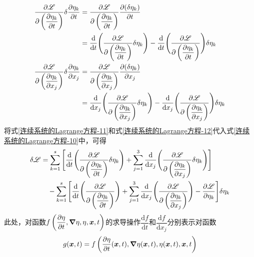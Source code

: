 \begin{align}
	\frac{\partial \mathscr{L}}{\partial \left(\dfrac{\partial \eta_k}{\partial t}\right)} \delta \dfrac{\partial \eta_k}{\partial t} & = \frac{\partial \mathscr{L}}{\partial \left(\dfrac{\partial \eta_k}{\partial t}\right)} \dfrac{\partial (\delta \eta_k)}{\partial t} \nonumber \\
	& = \frac{\mathrm{d}}{\mathrm{d}t} \Bigg(\frac{\partial \mathscr{L}}{\partial \left(\dfrac{\partial \eta_k}{\partial t}\right)} \delta \eta_k\Bigg) - \frac{\mathrm{d}}{\mathrm{d}t} \Bigg(\frac{\partial \mathscr{L}}{\partial \left(\dfrac{\partial \eta_k}{\partial t}\right)}\Bigg) \delta \eta_k \label{连续系统的Lagrange方程-11} \\
	\frac{\partial \mathscr{L}}{\partial \left(\dfrac{\partial \eta_k}{\partial x_j}\right)} \delta \dfrac{\partial \eta_k}{\partial x_j} & = \frac{\partial \mathscr{L}}{\partial \left(\dfrac{\partial \eta_k}{\partial x_j}\right)} \dfrac{\partial (\delta \eta_k)}{\partial x_j} \nonumber \\
	& = \frac{\mathrm{d}}{\mathrm{d}x_j} \Bigg(\frac{\partial \mathscr{L}}{\partial \left(\dfrac{\partial \eta_k}{\partial x_j}\right)} \delta \eta_k\Bigg) - \frac{\mathrm{d}}{\mathrm{d}x_j} \Bigg(\frac{\partial \mathscr{L}}{\partial \left(\dfrac{\partial \eta_k}{\partial x_j}\right)}\Bigg) \delta \eta_k \label{连续系统的Lagrange方程-12}
\end{align}
将式\eqref{连续系统的Lagrange方程-11}和式\eqref{连续系统的Lagrange方程-12}代入式\eqref{连续系统的Lagrange方程-10}中，可得
\begin{align}
	\delta \mathscr{L} & = \sum_{k=1}^s \Bigg[\frac{\mathrm{d}}{\mathrm{d}t} \Bigg(\frac{\partial \mathscr{L}}{\partial \left(\dfrac{\partial \eta_k}{\partial t}\right)} \delta \eta_k\Bigg) + \sum_{j=1}^3 \frac{\mathrm{d}}{\mathrm{d}x_j} \Bigg(\frac{\partial \mathscr{L}}{\partial \left(\dfrac{\partial \eta_k}{\partial x_j}\right)} \delta \eta_k\Bigg)\Bigg] \nonumber \\
	& \quad {}- \sum_{k=1}^s \Bigg[\frac{\mathrm{d}}{\mathrm{d}t} \Bigg(\frac{\partial \mathscr{L}}{\partial \left(\dfrac{\partial \eta_k}{\partial t}\right)}\Bigg) + \sum_{j=1}^3 \frac{\mathrm{d}}{\mathrm{d}x_j} \Bigg(\frac{\partial \mathscr{L}}{\partial \left(\dfrac{\partial \eta_k}{\partial x_j}\right)}\Bigg) - \frac{\partial \mathscr{L}}{\partial \eta_k}\Bigg] \delta \eta_k
	\label{连续系统的Lagrange方程-13}
\end{align}
此处，对函数$f\left(\dfrac{\partial \eta}{\partial t},\boldsymbol{\nabla} \eta,\eta,\boldsymbol{x},t\right)$的求导操作$\dfrac{\mathrm{d} f}{\mathrm{d}t}$和$\dfrac{\mathrm{d} f}{\mathrm{d}x_j}$分别表示对函数
\begin{equation*}
	g(\boldsymbol{x},t) = f\left(\dfrac{\partial \eta}{\partial t}(\boldsymbol{x},t),\boldsymbol{\nabla} \eta(\boldsymbol{x},t),\eta(\boldsymbol{x},t),\boldsymbol{x},t\right)
\end{equation*}
